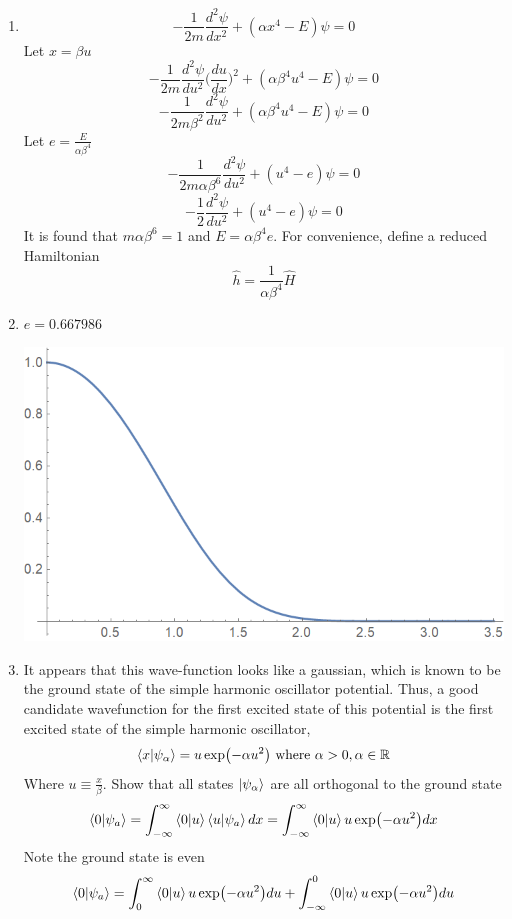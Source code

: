 \begin{sol}
\begin{enumerate}[label=\textbf{(\alph*)}]
\item
$$-\frac{1}{2m}\frac{d^2\psi}{dx^2}+(\alpha x^4-E)\psi=0$$
Let $x=\beta u$
$$-\frac{1}{2m}\frac{d^2\psi}{du^2}\Big(\frac{du}{dx}\Big) ^2+(\alpha \beta^4u^4-E)\psi=0$$
$$-\frac{1}{2m\beta^2}\frac{d^2\psi}{du^2}+(\alpha\beta^4u^4-E)\psi=0$$
Let $e=\frac{E}{\alpha\beta^4}$ 
$$-\frac{1}{2m\alpha\beta^6}\frac{d^2\psi}{du^2}+(u^4-e)\psi=0$$
$$-\frac{1}{2}\frac{d^2\psi}{du^2}+(u^4-e)\psi=0$$
It is found that $m\alpha\beta^6=1$ and $E=\alpha\beta^4e$. For convenience, define a reduced Hamiltonian
$$\hat h=\frac{1}{\alpha\beta^4}\hat H$$

\item
$e=0.667986$ \\
\begin{center}
\includegraphics[scale=0.4]{P02/HO4.png}
\end{center}
\item
It appears that this wave-function looks like a gaussian, which is known to be the ground state of the simple harmonic oscillator potential. Thus, a good candidate wavefunction for the first excited state of this potential is the first excited state of the simple harmonic oscillator, 
$$\braket{x}{\psi_\alpha}=u\exp(-\alpha u^2)\text{ where }\alpha>0, \alpha\in\mathbb R$$ 
Where $u\equiv\frac{x}{\beta}$. Show that all states $\ket{\psi_\alpha}$ are all orthogonal to the ground state
$$\braket{0}{\psi_a}=\int_{-\infty}^\infty\braket{0}{u}\braket{u}{\psi_a}dx=\int_{-\infty}^\infty\braket{0}{u}u\exp(-\alpha u^2)dx$$ 
Note the ground state is even
$$\braket{0}{\psi_a}=\int_0^\infty\braket{0}{u}u\exp(-\alpha u^2)du+\int_{-\infty}^0\braket{0}{u}u\exp(-\alpha u^2)du$$

\end{enumerate}
\end{sol}
